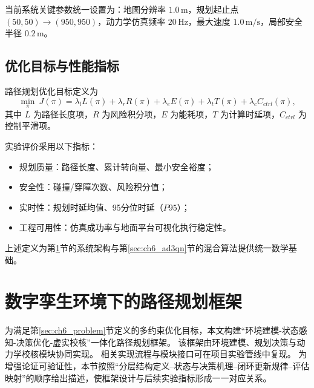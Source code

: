 \documentclass[UTF8,zihao=-4,a4paper,oneside,openany]{ctexrep}
\numberwithin{equation}{chapter}
\theoremstyle{plain}
\theoremstyle{definition}
\newenvironment{myitemize}{\begin{itemize}[noitemsep,topsep=0pt]}{\end{itemize}}
\begin{document}
当前系统关键参数统一设置为：地图分辨率 $1.0\,\mathrm{m}$，规划起止点 $(50,50)\rightarrow(950,950)$，动力学仿真频率 $20\,\mathrm{Hz}$，最大速度 $1.0\,\mathrm{m/s}$，局部安全半径 $0.2\,\mathrm{m}$。

\subsection{优化目标与性能指标}
\label{subsec:ch6_objective}

路径规划优化目标定义为
\begin{equation}
\min_{\pi}\ J(\pi)=
\lambda_l L(\pi)
+\lambda_r R(\pi)
+\lambda_e E(\pi)
+\lambda_t T(\pi)
+\lambda_c C_{ctrl}(\pi),
\label{eq:ch6_objective}
\end{equation}
其中 $L$ 为路径长度项，$R$ 为风险积分项，$E$ 为能耗项，$T$ 为计算时延项，$C_{ctrl}$ 为控制平滑项。

实验评价采用以下指标：
\begin{myitemize}
	\item 规划质量：路径长度、累计转向量、最小安全裕度；
	\item 安全性：碰撞/穿障次数、风险积分值；
	\item 实时性：规划时延均值、95分位时延（$P95$）；
	\item 工程可用性：仿真成功率与地面平台可视化执行稳定性。
\end{myitemize}

上述定义为第\ref{sec:ch6_framework}节的系统架构与第\ref{sec:ch6_ad3qn}节的混合算法提供统一数学基础。

\section{数字孪生环境下的路径规划框架}
\label{sec:ch6_framework}

为满足第\ref{sec:ch6_problem}节定义的多约束优化目标，本文构建“环境建模-状态感知-决策优化-虚实校核”一体化路径规划框架。
该框架由环境建模、规划决策与动力学校核模块协同实现。
相关实现流程与模块接口可在项目实验管线中复现\cite{hart1968astar,mnih2015dqn,vanhasselt2016double,wang2026raumfahrt}。
为增强论证可验证性，本节按照“分层结构定义--状态与决策机理--闭环更新规律--评估映射”的顺序给出描述，使框架设计与后续实验指标形成一一对应关系。
\end{document}
